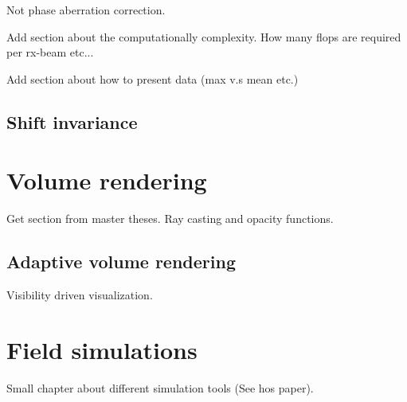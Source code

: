Not phase aberration correction.

Add section about the computationally complexity. How many flops are required per rx-beam etc...

Add section about how to present data (max v.s mean etc.)
						
\subsection{Shift invariance}

\section{Volume rendering}

Get section from master theses. Ray casting and opacity functions.

\subsection{Adaptive volume rendering}

Visibility driven visualization.

\section{Field simulations}

Small chapter about different simulation tools (See hos paper).
			
\endinput
